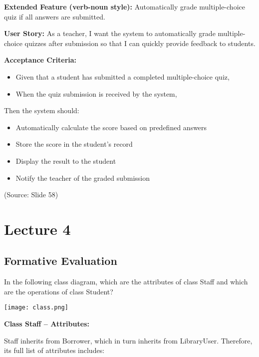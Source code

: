 \documentclass[12pt]{article}
\begin{document}
\textbf{Extended Feature (verb-noun style):} Automatically grade multiple-choice quiz if all answers are submitted.

\textbf{User Story:} As a teacher, I want the system to automatically grade multiple-choice quizzes after submission so that I can quickly provide feedback to students.

\textbf{Acceptance Criteria:}
\begin{itemize}
    \item Given that a student has submitted a completed multiple-choice quiz,
    \item When the quiz submission is received by the system,
\end{itemize}

Then the system should:
\begin{itemize}
    \item Automatically calculate the score based on predefined answers
    \item Store the score in the student's record
    \item Display the result to the student
    \item Notify the teacher of the graded submission
\end{itemize}

(Source: Slide 58)

\newpage


\section{Lecture 4}

\subsection{Formative Evaluation}

\begin{questionbox}
In the following class diagram, which are the attributes of class Staff and which are the operations of class Student?

\begin{center}
\texttt{[image: class.png]}
\end{center}
\end{questionbox}

\textbf{Class Staff -- Attributes:}

Staff inherits from Borrower, which in turn inherits from LibraryUser. Therefore, its full list of attributes includes:
\end{document}
